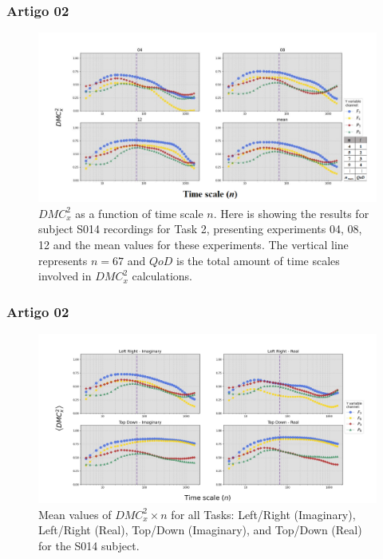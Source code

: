 \documentclass[11pt, aspectratio=169]{beamer}
\begin{document}
\begin{frame}
  \frametitle{Artigo 02}

  \begin{figure}[!h]
    \includegraphics[height=.5\paperheight]{../Figures/art_02/Fig2.png}
    \caption{$DMC_{x}^{2}$ as a function of time scale $n$. Here is showing the results for subject S014 recordings for Task 2, presenting experiments 04, 08, 12 and the mean values for these experiments. The vertical line represents $n=67$ and $QoD$ is the total amount of time scales involved in $DMC_{x}^{2}$ calculations.}
    \label{fig02}
  \end{figure}
\end{frame}


\begin{frame}
  \frametitle{Artigo 02}

  \begin{figure}[!h]
    \includegraphics[height=.5\paperheight]{../Figures/art_02/Fig3.jpg}
    \caption{Mean values of $DMC_{x}^{2} \times n$ for all Tasks: Left/Right (Imaginary), Left/Right (Real), Top/Down (Imaginary), and Top/Down (Real) for the S014 subject.}
    \label{fig03}
  \end{figure}
\end{frame}
\end{document}
